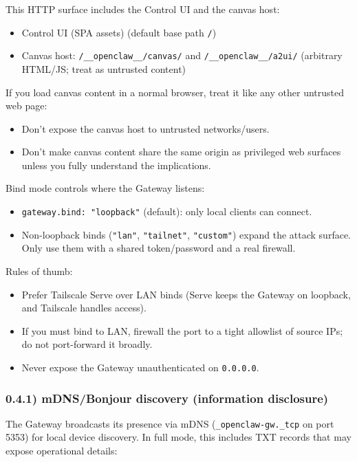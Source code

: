 This HTTP surface includes the Control UI and the canvas host:

\begin{itemize}
  \item Control UI (SPA assets) (default base path \texttt{/})
  \item Canvas host: \texttt{/\_\_openclaw\_\_/canvas/} and \texttt{/\_\_openclaw\_\_/a2ui/} (arbitrary HTML/JS; treat as untrusted content)
\end{itemize}


If you load canvas content in a normal browser, treat it like any other untrusted web page:

\begin{itemize}
  \item Don't expose the canvas host to untrusted networks/users.
  \item Don't make canvas content share the same origin as privileged web surfaces unless you fully understand the implications.
\end{itemize}


Bind mode controls where the Gateway listens:

\begin{itemize}
  \item \texttt{gateway.bind: "loopback"} (default): only local clients can connect.
  \item Non-loopback binds (\texttt{"lan"}, \texttt{"tailnet"}, \texttt{"custom"}) expand the attack surface. Only use them with a shared token/password and a real firewall.
\end{itemize}


Rules of thumb:

\begin{itemize}
  \item Prefer Tailscale Serve over LAN binds (Serve keeps the Gateway on loopback, and Tailscale handles access).
  \item If you must bind to LAN, firewall the port to a tight allowlist of source IPs; do not port-forward it broadly.
  \item Never expose the Gateway unauthenticated on \texttt{0.0.0.0}.
\end{itemize}


\subsubsection{0.4.1) mDNS/Bonjour discovery (information disclosure)}


The Gateway broadcasts its presence via mDNS (\texttt{\_openclaw-gw.\_tcp} on port 5353) for local device discovery. In full mode, this includes TXT records that may expose operational details:

